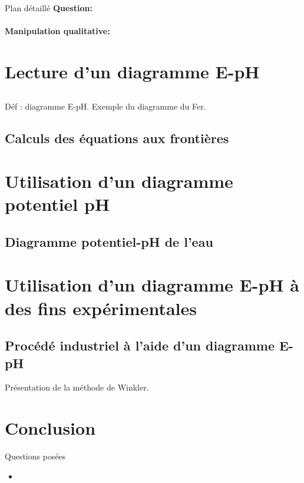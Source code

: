 \begin{reportBlock}{Plan détaillé}
\textbf{Question:}

\paragraph*{Manipulation qualitative:} \textcolor{green}{}

\section{Lecture d'un diagramme E-pH}

\subsection{}
Déf : diagramme E-pH. Exemple du diagramme du Fer.

\subsection{Calculs des équations aux frontières}


\section{Utilisation d'un diagramme potentiel pH}

\subsection{Diagramme potentiel-pH de l'eau}

\section{Utilisation d'un diagramme E-pH à des fins expérimentales}

\subsection{Procédé industriel à l'aide d'un diagramme E-pH}
Présentation de la méthode de Winkler.

\section{Conclusion} 


\end{reportBlock}

\begin{reportBlock}{Questions posées}

\begin{itemize}

\item 
\textcolor{purple}{}

\end{itemize}


\end{reportBlock}

